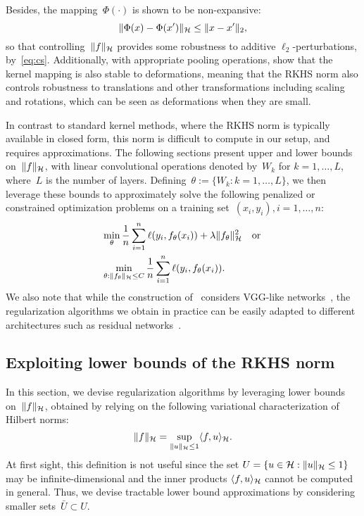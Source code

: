Besides, the mapping~$\Phi(\cdot)$ is shown to be non-expansive:
\begin{equation}
\label{eq:non_expansive}
\|\Phi(x) - \Phi(x') \|_{\mathcal H} \leq \|x - x'\|_2,
\end{equation}
so that controlling~$\|f\|_{\mathcal H}$ provides some robustness to additive $\ell_2$-perturbations, by~\eqref{eq:cs}.
Additionally, with appropriate pooling operations, \citet{bietti2018group} show that the kernel mapping is also
stable to deformations, meaning that the RKHS norm also controls robustness to translations
and other transformations including scaling and rotations,
which can be seen as deformations when they are small.

In contrast to standard kernel methods, where the RKHS norm is typically available in closed form, this norm is difficult to compute in our setup, and requires approximations.
The following sections present upper and lower bounds on~$\|f\|_{{\mathcal H}}$,
with linear convolutional operations denoted by~$W_k$ for $k=1, \ldots, L$, where~$L$ is the number of layers.
Defining~$\theta := \{W_k : k = 1, \ldots, L\}$, we then leverage these bounds to approximately solve the following
penalized or constrained optimization problems on a training set~$(x_i, y_i), i = 1, \ldots, n$:
\begin{align}
\label{eq:penalty_or_constraint}
& \min_\theta \frac{1}{n} \sum_{i=1}^n \ell(y_i, f_\theta(x_i)) + \lambda \|f_\theta\|_{\mathcal H}^2 \quad \text{or } \\
& \min_{\theta: \|f_\theta\|_{\mathcal H} \leq C} \frac{1}{n} \sum_{i=1}^n \ell(y_i, f_\theta(x_i)).
\end{align}
We also note that while the construction of~\citet{bietti2018group} considers VGG-like networks~\citep{simonyan2014very},
the regularization algorithms we obtain in practice can be easily adapted to different architectures
such as residual networks~\citep{he2016deep}.

\subsection{Exploiting lower bounds of the RKHS norm}
\label{sub:lower_bounds}

In this section, we devise regularization algorithms by leveraging lower bounds on~$\|f\|_{\mathcal H}$,
obtained by relying on the following variational characterization of Hilbert norms:
\begin{equation*}
\|f\|_{\mathcal H} = \sup_{\|u\|_{\mathcal H} \leq 1} \langle f, u \rangle_{\mathcal H}.
\end{equation*}
At first sight, this definition is not useful since the set $U = \{u \in {\mathcal H} : \|u\|_{\mathcal H} \leq 1\}$ may be 
infinite-dimensional
 and the inner products $\langle f, u \rangle_{\mathcal H}$ cannot be
computed in general. Thus, we devise tractable lower bound approximations by considering smaller sets~$\bar{U} \subset U$.

